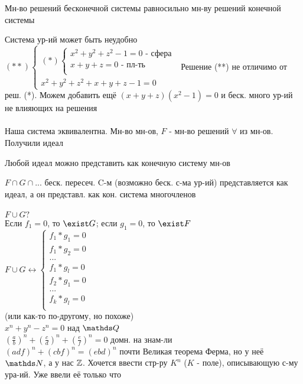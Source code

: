 \documentclass[geometry.tex]{subfiles}
\begin{document}
\begin{examples}
\begin{enumerate}
\begin{uutv}
\begin{enumerate}
              \begin{ttheorem}
                Мн-во решений бесконечной системы равносильно мн-ву решений конечной системы
              \end{ttheorem}
              Система ур-ий может быть неудобно
              $(**)\begin{cases}
		(*) \begin{cases}
		x^2 + y^2 + z^2 - 1 = 0 \text{ - сфера}\\
              	x + y + z = 0  \text{ - пл-ть}\\
            	\end{cases}\\
		x^2 + y^2 + z^2 + x + y + z - 1 = 0
	\end{cases}$
	Решение (**) не отличимо от реш. (*). Можем добавить ещё $(x + y + z) (x^2 - 1) = 0$ и беск. много ур-ий не влияющих на решения\\ \ \\
	Наша система эквивалентна. Мн-во мн-ов, $F$ - мн-во решений $\forall$ из мн-ов. Получили идеал
              \begin{ttheorem}[Гильберта]
                Любой идеал можно представить как конечную систему мн-ов
              \end{ttheorem}
              $F \cap G \cap ...$ беск. пересеч. C-м (возможно беск. с-ма ур-ий) представляется как идеал, а он представл. как кон. система многочленов \\ \ \\
	$F \cup G ?$\\ Если  $f_1=0$, то $\exist G$; если  $g_1=0$, то $\exist F$ \\
	$ F \cup G  \longleftrightarrow\begin{cases}
		f_1 * g_1 = 0\\
		f_1 * g_2 = 0\\
		...\\
		f_1 * g_l = 0\\
		f_2 * g_1 = 0\\
		...\\
		f_k * g_l = 0\\
            	\end{cases} $\\
	(или как-то по-другому, но похоже)\\
	$x^n + y^n - z^n = 0$ над $\Q$\\
	$(\frac{a}{b})^n + (\frac{c}{d})^n + (\frac{e}{f})^n = 0$ домн. на знам-ли\\
	$(adf)^ n + (cbf)^n = (ebd)^n$ почти Великая теорема Ферма, но у неё $\N$, а у нас $\mathbb{Z}$. Хочется ввести стр-ру $K^n$ ($K$ - поле), описывающую с-му ура-ий. Уже ввели её только что

\end{enumerate}
\end{uutv}
\end{enumerate}
\end{examples}
\end{document}
